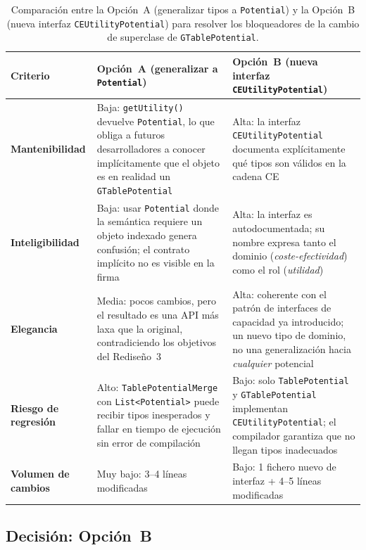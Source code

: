 \documentclass[11pt,a4paper]{article}
\newcommand{\code}[1]{\texttt{#1}}
\begin{document}
\begin{table}[H]
\centering
\small
\setlength{\tabcolsep}{4pt}
\begin{tabular}{p{3.0cm}|p{4.8cm}|p{4.8cm}}
\toprule
\textbf{Criterio}
  & \textbf{Opción~A (generalizar a \code{Potential})}
  & \textbf{Opción~B (nueva interfaz \code{CEUtilityPotential})} \\
\midrule
\textbf{Mantenibilidad} &
  Baja: \code{getUtility()} devuelve \code{Potential}, lo que obliga a
  futuros desarrolladores a conocer implícitamente que el objeto
  es en realidad un \code{GTablePotential} &
  Alta: la interfaz \code{CEUtilityPotential} documenta explícitamente
  qué tipos son válidos en la cadena CE \\
\midrule
\textbf{Inteligibilidad} &
  Baja: usar \code{Potential} donde la semántica requiere un objeto
  indexado genera confusión; el contrato implícito no es visible en
  la firma &
  Alta: la interfaz es autodocumentada; su nombre expresa tanto el
  dominio (\emph{coste-efectividad}) como el rol (\emph{utilidad}) \\
\midrule
\textbf{Elegancia} &
  Media: pocos cambios, pero el resultado es una API más laxa que
  la original, contradiciendo los objetivos del Rediseño~3 &
  Alta: coherente con el patrón de interfaces de capacidad ya
  introducido; un nuevo tipo de dominio, no una generalización
  hacia \emph{cualquier} potencial \\
\midrule
\textbf{Riesgo de regresión} &
  Alto: \code{TablePotentialMerge} con \code{List<Potential>} puede
  recibir tipos inesperados y fallar en tiempo de ejecución sin
  error de compilación &
  Bajo: solo \code{TablePotential} y \code{GTablePotential} implementan
  \code{CEUtilityPotential}; el compilador garantiza que no llegan tipos
  inadecuados \\
\midrule
\textbf{Volumen de cambios} &
  Muy bajo: 3--4 líneas modificadas &
  Bajo: 1 fichero nuevo de interfaz + 4--5 líneas modificadas \\
\bottomrule
\end{tabular}
\caption{Comparación entre la Opción~A (generalizar tipos a \code{Potential})
         y la Opción~B (nueva interfaz \code{CEUtilityPotential}) para
         resolver los bloqueadores de la cambio de superclase de \code{GTablePotential}.}
\label{tab:gtable-comparacion}
\end{table}

\subsection{Decisión: Opción~B}
\label{sec:gtable-decision}
\end{document}
